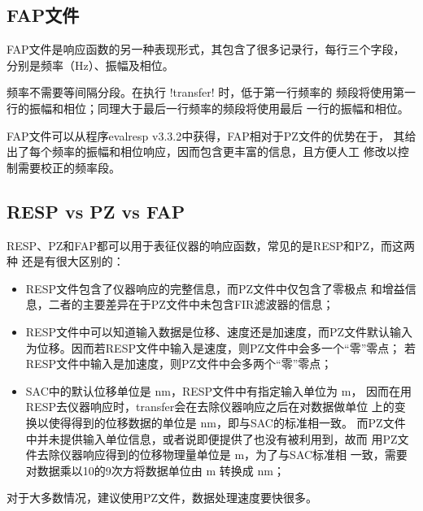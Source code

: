 \subsection{FAP文件}
FAP文件是响应函数的另一种表现形式，其包含了很多记录行，每行三个字段，
分别是频率（\si{Hz}）、振幅及相位。

频率不需要等间隔分段。在执行 !transfer! 时，低于第一行频率的
频段将使用第一行的振幅和相位；同理大于最后一行频率的频段将使用最后
一行的振幅和相位。

FAP文件可以从程序evalresp v3.3.2中获得，FAP相对于PZ文件的优势在于，
其给出了每个频率的振幅和相位响应，因而包含更丰富的信息，且方便人工
修改以控制需要校正的频率段。

\subsection{RESP vs PZ vs FAP}
RESP、PZ和FAP都可以用于表征仪器的响应函数，常见的是RESP和PZ，而这两种
还是有很大区别的：
\begin{itemize}
\item RESP文件包含了仪器响应的完整信息，而PZ文件中仅包含了零极点
    和增益信息，二者的主要差异在于PZ文件中未包含FIR滤波器的信息；
\item RESP文件中可以知道输入数据是位移、速度还是加速度，而PZ文件默认输入
    为位移。因而若RESP文件中输入是速度，则PZ文件中会多一个``零''零点；
    若RESP文件中输入是加速度，则PZ文件中会多两个``零''零点；
\item SAC中的默认位移单位是 \si{\nm}，RESP文件中有指定输入单位为 \si{\m}，
    因而在用RESP去仪器响应时，transfer会在去除仪器响应之后在对数据做单位
    上的变换以使得得到的位移数据的单位是 \si{\nm}，即与SAC的标准相一致。
    而PZ文件中并未提供输入单位信息，或者说即便提供了也没有被利用到，故而
    用PZ文件去除仪器响应得到的位移物理量单位是 \si{\m}，为了与SAC标准相
    一致，需要对数据乘以10的9次方将数据单位由 \si{\m} 转换成 \si{\nm}；
\end{itemize}

对于大多数情况，建议使用PZ文件，数据处理速度要快很多。

